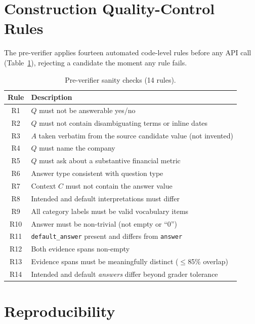 \section{Construction Quality-Control Rules}
\label{app:qc}

The pre-verifier applies fourteen automated code-level rules before any API call (Table~\ref{tab:qc}), rejecting a candidate the moment any rule fails.

\begin{table}[t]
\centering

\small
\begin{tabular}{cp{}}
\toprule
Rule & Description \\
\midrule
R1  & $Q$ must not be answerable yes/no \\
R2  & $Q$ must not contain disambiguating terms or inline dates \\
R3  & $A$ taken verbatim from the source candidate value (not invented) \\
R4  & $Q$ must name the company \\
R5  & $Q$ must ask about a substantive financial metric \\
R6  & Answer type consistent with question type \\
R7  & Context $C$ must not contain the answer value \\
R8  & Intended and default interpretations must differ \\
R9  & All category labels must be valid vocabulary items \\
R10 & Answer must be non-trivial (not empty or ``0'') \\
R11 & \texttt{default\_answer} present and differs from \texttt{answer} \\
R12 & Both evidence spans non-empty \\
R13 & Evidence spans must be meaningfully distinct ($\leq$85\% overlap) \\
R14 & Intended and default \emph{answers} differ beyond grader tolerance \\
\bottomrule
\end{tabular}
\caption{Pre-verifier sanity checks (14 rules).}
\label{tab:qc}
\end{table}


\section{Reproducibility}
\label{app:repro}

